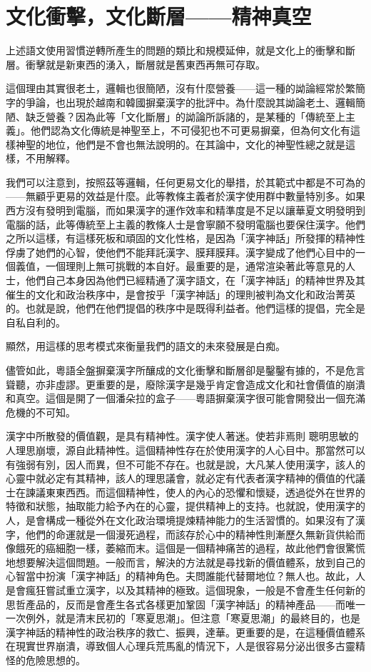 \documentclass[a5paper, 10pt, openany]{book} %
\begin{document}
\section{文化衝擊，文化斷層——精神真空}

上述語文使用習慣逆轉所產生的問題的類比和規模延伸，就是文化上的衝擊和斷層。衝擊就是新東西的湧入，斷層就是舊東西再無可存取。

這個理由其實很老土，邏輯也很簡陋，沒有什麼營養——這一種的詏論經常於繁簡字的爭論，也出現於越南和韓國摒棄漢字的批評中。為什麼說其詏論老土、邏輯簡陋、缺乏營養？因為此等「文化斷層」的詏論所訴諸的，是某種的「傳統至上主義」。他們認為文化傳統是神聖至上，不可侵犯也不可更易摒棄，但為何文化有這樣神聖的地位，他們是不會也無法說明的。在其論中，文化的神聖性總之就是這樣，不用解釋。

我們可以注意到，按照茲等邏輯，任何更易文化的舉措，於其範式中都是不可為的——無顧乎更易的效益是什麼。此等教條主義者於漢字使用群中數量特別多。如果西方沒有發明到電腦，而如果漢字的運作效率和精準度是不足以讓華夏文明發明到電腦的話，此等傳統至上主義的教條人士是會寧願不發明電腦也要保住漢字。他們之所以這樣，有這樣死板和頑固的文化性格，是因為「漢字神話」所發揮的精神性俘虜了她們的心智，使他們不能拜託漢字、膜拜膜拜。漢字變成了他們心目中的一個義值，一個理則上無可挑戰的本自好。最重要的是，通常渲染著此等意見的人士，他們自己本身因為他們已經精通了漢字語文，在「漢字神話」的精神世界及其催生的文化和政治秩序中，是會按乎「漢字神話」的理則被判為文化和政治菁英的。也就是說，他們在他們提倡的秩序中是既得利益者。他們這樣的提倡，完全是自私自利的。

顯然，用這樣的思考模式來衡量我們的語文的未來發展是白痴。

儘管如此，粵語全盤摒棄漢字所釀成的文化衝擊和斷層卻是鑿鑿有據的，不是危言聳聽，亦非虛謬。更重要的是，廢除漢字是幾乎肯定會造成文化和社會價值的崩潰和真空。這個是開了一個潘朵拉的盒子——粵語摒棄漢字很可能會開發出一個充滿危機的不可知。

漢字中所散發的價值觀，是具有精神性。漢字使人著迷。使若非焉則 聰明思敏的人理思崩壞，源自此精神性。這個精神性存在於使用漢字的人心目中。那當然可以有強弱有別，因人而異，但不可能不存在。也就是說，大凡某人使用漢字，該人的心靈中就必定有其精神，該人的理思議會，就必定有代表者漢字精神的價值的代議士在諫議東東西西。而這個精神性，使人的內心的恐懼和懷疑，透過從外在世界的特徵和狀態，抽取能力給予內在的心靈，提供精神上的支持。也就說，使用漢字的人，是會構成一種從外在文化政治環境提煉精神能力的生活習慣的。如果沒有了漢字，他們的命運就是一個漫死過程，而該存於心中的精神性則漸歷久無新貨供給而像餓死的癌細胞一樣，萎縮而末。這個是一個精神痛苦的過程，故此他們會很驚慌地想要解決這個問題。一般而言，解決的方法就是尋找新的價值體系，放到自己的心智當中扮演「漢字神話」的精神角色。夫問誰能代替爾地位？無人也。故此，人是會瘋狂嘗試重立漢字，以及其精神的極致。這個現象，一般是不會產生任何新的思哲產品的，反而是會產生各式各樣更加鞏固「漢字神話」的精神產品——而唯一一次例外，就是清末民初的「寒夏思潮」。但注意「寒夏思潮」的最終目的，也是漢字神話的精神性的政治秩序的救亡、振興，達華。更重要的是，在這種價值體系在現實世界崩潰，導致個人心理兵荒馬亂的情況下，人是很容易分泌出很多古靈精怪的危險思想的。
\end{document}
